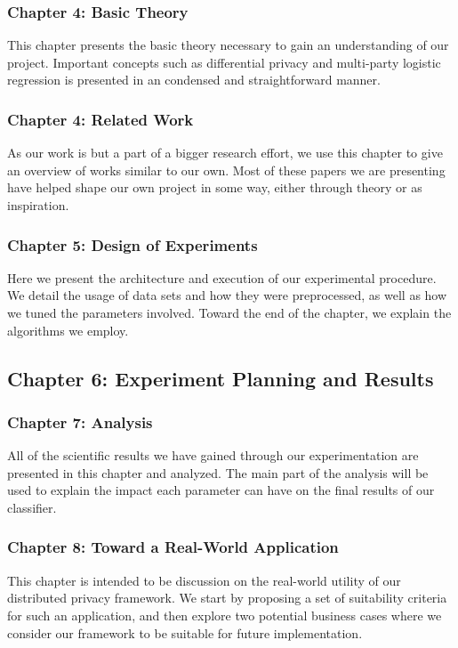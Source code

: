 \subsubsection{Chapter 4: Basic Theory}
This chapter presents the basic theory necessary to gain an understanding of our project. Important concepts such as differential privacy and multi-party logistic regression is presented in an condensed and straightforward manner.

\subsubsection{Chapter 4: Related Work}
As our work is but a part of a bigger research effort, we use this chapter to give an overview of works similar to our own. Most of these papers we are presenting have helped shape our own project in some way, either through theory or as inspiration.

\subsubsection{Chapter 5: Design of Experiments}
Here we present the architecture and execution of our experimental procedure. We detail the usage of data sets and how they were preprocessed, as well as how we tuned the parameters involved. Toward the end of the chapter, we explain the algorithms we employ.

\subsection{Chapter 6: Experiment Planning and Results}

\subsubsection{Chapter 7: Analysis}
All of the scientific results we have gained through our experimentation are presented in this chapter and analyzed. The main part of the analysis will be used to explain the impact each parameter can have on the final results of our classifier.

\subsubsection{Chapter 8: Toward a Real-World Application}
This chapter is intended to be discussion on the real-world utility of our distributed privacy framework. We start by proposing a set of suitability criteria for such an application, and then explore two potential business cases where we consider our framework to be suitable for future implementation.   

